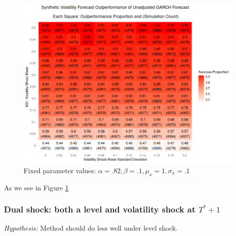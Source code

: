 \documentclass[11pt]{article}
\theoremstyle{definition}
\begin{document}
\begin{figure}[h!]
  \begin{center}
    \includegraphics[scale=.45]{simulation_plots/standard_simulation_alpha_.82_beta_.1.png}
    \caption{Fixed parameter values: $\alpha = .82, \beta = .1, \mu_{x} = 1, \sigma_{x} = .1$}
    \label{fig:heavy_alpha}
  \end{center}
  \end{figure}
  
As we see in Figure \ref{fig:heavy_alpha}

\subsubsection{Dual shock: both a level and volatility shock at $T^{*}+1$}
\textit{Hypothesis:} Method should do less well under level shock.
\end{document}
